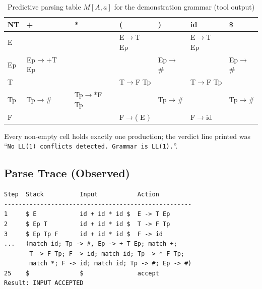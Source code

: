 \documentclass[12pt,a4paper,oneside,openany]{report}
\newcommand{\code}[1]{\texttt{#1}}
\begin{document}
\begin{table}[h]
  \caption{Predictive parsing table $M[A,a]$ for the demonstration grammar (tool output)}
  \label{tab:parsertable}
  \small
  \setlength{\tabcolsep}{3pt}
  \begin{tabular}{l|l|l|l|l|l|l}
    \toprule
    \textbf{NT} & \textbf{+} & \textbf{*} & \textbf{(} & \textbf{)} & \textbf{id} & \textbf{\$} \\
    \midrule
    E     &        &        & E$\to$T Ep &        & E$\to$T Ep &        \\
    Ep    & Ep$\to$+T Ep &                  &            & Ep$\to$\# &            & Ep$\to$\# \\
    T     &        &        & T$\to$F Tp &        & T$\to$F Tp &         \\
    Tp    & Tp$\to$\# & Tp$\to$*F Tp &            & Tp$\to$\# &            & Tp$\to$\# \\
    F     &        &        & F$\to$( E ) &        & F$\to$id &          \\
    \bottomrule
  \end{tabular}
\end{table}
\noindent Every non-empty cell holds exactly one production; the verdict
line printed was ``\code{No LL(1) conflicts detected. Grammar is LL(1).}''.

\subsection{Parse Trace (Observed)}
\begin{lstlisting}[style=outputcode,label=lst:trace,caption={Trace excerpt for ``id + id * id''; match rows omitted for brevity as printed}]
Step  Stack          Input           Action
----------------------------------------------------
1     $ E            id + id * id $  E -> T Ep
2     $ Ep T         id + id * id $  T -> F Tp
3     $ Ep Tp F      id + id * id $  F -> id
...   (match id; Tp -> #, Ep -> + T Ep; match +;
       T -> F Tp; F -> id; match id; Tp -> * F Tp;
       match *; F -> id; match id; Tp -> #; Ep -> #)
25    $              $               accept
Result: INPUT ACCEPTED
\end{lstlisting}
\end{document}
